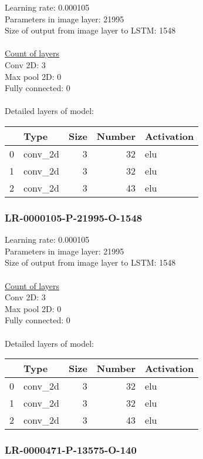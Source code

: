 Learning rate: 0.000105
\\Parameters in image layer: 21995
\\Size of output from image layer to LSTM: 1548
\\\\\underline{Count of layers} 
\\Conv 2D:           3\\Max pool 2D:      0\\Fully connected:  0
\\\\Detailed layers of model: \\\begin{tabular}{rlrrl}
\hline
    & Type    &   Size &   Number & Activation   \\
\hline
  0 & conv\_2d &      3 &       32 & elu          \\
  1 & conv\_2d &      3 &       32 & elu          \\
  2 & conv\_2d &      3 &       43 & elu          \\
\hline
\end{tabular}\subsubsection*{LR-0000105-P-21995-O-1548}
Learning rate: 0.000105
\\Parameters in image layer: 21995
\\Size of output from image layer to LSTM: 1548
\\\\\underline{Count of layers} 
\\Conv 2D:           3\\Max pool 2D:      0\\Fully connected:  0
\\\\Detailed layers of model: \\\begin{tabular}{rlrrl}
\hline
    & Type    &   Size &   Number & Activation   \\
\hline
  0 & conv\_2d &      3 &       32 & elu          \\
  1 & conv\_2d &      3 &       32 & elu          \\
  2 & conv\_2d &      3 &       43 & elu          \\
\hline
\end{tabular}\subsubsection*{LR-0000471-P-13575-O-140}
